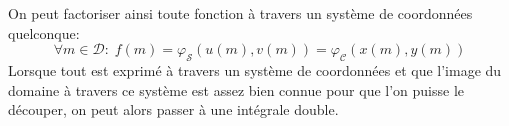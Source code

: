 On peut factoriser ainsi toute fonction à travers un système de coordonnées quelconque:
\begin{displaymath}
\forall m\in \mathcal D:\; f(m)=\varphi_{\mathcal S}(u(m),v(m))= \varphi_{\mathcal C}(x(m),y(m))
\end{displaymath}
Lorsque tout est exprimé à travers un système de coordonnées et que l'image du domaine à travers ce système est assez bien connue pour que l'on puisse le découper, on peut alors passer à une intégrale double.
